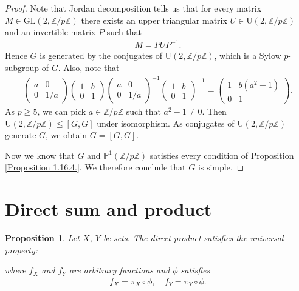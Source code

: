 \documentclass[12pt]{report}
\theoremstyle{plain}
\newtheorem{proposition}[theorem]{Proposition}
\theoremstyle{remark}
\theoremstyle{definition}
\newcommand{\Z}{\mathbb{Z}}
\begin{document}
\begin{proof}
    Note that Jordan decomposition tells us that for every matrix $M\in \mathrm{GL}(2,\Z/p\Z)$ there exists an upper triangular matrix $U\in\mathrm{U}(2,\Z/p\Z)$ and an invertible matrix $P$ such that
    \begin{align*}
        M=PUP^{-1}.
    \end{align*}
    Hence $G$ is generated by the conjugates of $\mathrm{U}(2,\Z/p\Z)$, which is a Sylow $p$-subgroup of $G$. Also, note that
    \begin{align*}
        \begin{pmatrix}
            a & 0 \\ 0 & 1/a
        \end{pmatrix} \begin{pmatrix}
            1 & b \\ 0 & 1
        \end{pmatrix} \begin{pmatrix}
            a & 0 \\ 0 & 1/a
        \end{pmatrix}^{-1} \begin{pmatrix}
            1 & b \\ 0 & 1
        \end{pmatrix}^{-1} = \begin{pmatrix}
            1 & b(a^2 - 1) \\ 0 & 1
        \end{pmatrix}.
    \end{align*}
    As $p\ge 5$, we can pick $a\in \Z/p\Z$ such that $a^2-1\neq 0$. Then $\mathrm{U}(2,\Z/p\Z)\le [G,G]$ under isomorphism. As conjugates of $\mathrm{U}(2,\Z/p\Z)$ generate $G$, we obtain $G=[G,G]$.

    Now we know that $G$ and $\mathbb{P}^1(\Z/p\Z)$ satisfies every condition of Proposition \ref{Proposition 1.16.4.}. We therefore conclude that $G$ is simple.
\end{proof}


\clearpage
\section{Direct sum and product}
\begin{proposition}
    Let $X$, $Y$ be sets. The direct product satisfies the universal property:
    \begin{figure}[H]
    \centering
    \end{figure}
    \noindent
    where $f_X$ and $f_Y$ are arbitrary functions and $\phi$ satisfies
    \begin{align*}
        f_X=\pi_X\circ \phi,\quad f_Y=\pi_Y\circ \phi.
    \end{align*}
\end{proposition}
\end{document}
